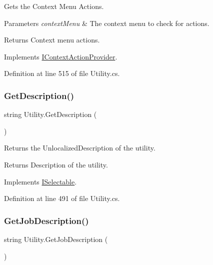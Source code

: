 Gets the Context Menu Actions. 


\begin{DoxyParams}{Parameters}
{\em context\+Menu} & The context menu to check for actions.\\
\hline
\end{DoxyParams}
\begin{DoxyReturn}{Returns}
Context menu actions.
\end{DoxyReturn}


Implements \hyperlink{interface_i_context_action_provider_acb23b31fd7720af55c607a3c12634d1e}{I\+Context\+Action\+Provider}.



Definition at line 515 of file Utility.\+cs.

\mbox{\label{class_utility_a1571ffbfff4e7b254842e7078e5725e0}} 
\subsubsection{\texorpdfstring{Get\+Description()}{GetDescription()}}
{\footnotesize\ttfamily string Utility.\+Get\+Description (\begin{DoxyParamCaption}{ }\end{DoxyParamCaption})}



Returns the Unlocalized\+Description of the utility. 

\begin{DoxyReturn}{Returns}
Description of the utility.
\end{DoxyReturn}


Implements \hyperlink{interface_i_selectable_a1d8947a443b6214cff01f2d75c8bc75a}{I\+Selectable}.



Definition at line 491 of file Utility.\+cs.

\mbox{\label{class_utility_a5689ffa1e6e2d4df20a92fd0a9f24309}} 
\subsubsection{\texorpdfstring{Get\+Job\+Description()}{GetJobDescription()}}
{\footnotesize\ttfamily string Utility.\+Get\+Job\+Description (\begin{DoxyParamCaption}{ }\end{DoxyParamCaption})}



